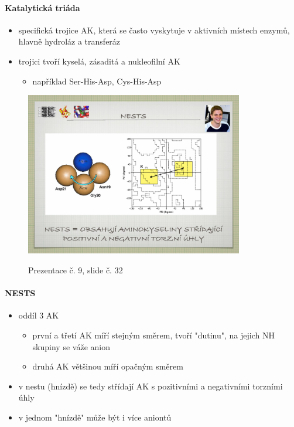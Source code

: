 \documentclass[DIV=8]{scrreprt}
\begin{document}
\paragraph{Katalytická triáda}
\begin{itemize}[nosep]
    \item specifická trojice AK, která se často vyskytuje v aktivních místech enzymů, hlavně hydroláz a transferáz
    \item trojici tvoří kyselá, zásaditá a nukleofilní AK
\begin{itemize}[nosep]
    \item například Ser-His-Asp, Cys-His-Asp
\end{itemize}

\end{itemize}



\begin{figure}
    \caption{Prezentace č. 9, slide č. 32}
    \includegraphics[width=0.85\textwidth]{slides-9/slide-32.jpg}
    \centering
    \label{slides-9-slide-32}
\end{figure}

\paragraph{NESTS}
\begin{itemize}[nosep]
    \item oddíl 3 AK
\begin{itemize}[nosep]
    \item první a třetí AK míří stejným směrem, tvoří "dutinu", na jejich NH skupiny se váže anion
    \item druhá AK většinou míří opačným směrem
\end{itemize}

    \item v nestu (hnízdě) se tedy střídají AK s pozitivními a negativními torzními úhly
    \item v jednom "hnízdě" může být i více aniontů
\end{itemize}
\end{document}
